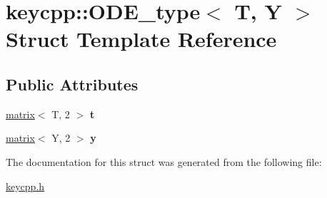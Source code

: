 \hypertarget{structkeycpp_1_1_o_d_e__type}{\section{keycpp\-:\-:O\-D\-E\-\_\-type$<$ T, Y $>$ Struct Template Reference}
\label{structkeycpp_1_1_o_d_e__type}
}
\subsection*{Public Attributes}
\begin{DoxyCompactItemize}
\item 
\hypertarget{structkeycpp_1_1_o_d_e__type_a7472927d5cc31aaf06d8dd1024b7640e}{\hyperlink{classkeycpp_1_1matrix}{matrix}$<$ T, 2 $>$ {\bfseries t}}\label{structkeycpp_1_1_o_d_e__type_a7472927d5cc31aaf06d8dd1024b7640e}

\item 
\hypertarget{structkeycpp_1_1_o_d_e__type_aafb0eeede0354cc546c0114ef3c15129}{\hyperlink{classkeycpp_1_1matrix}{matrix}$<$ Y, 2 $>$ {\bfseries y}}\label{structkeycpp_1_1_o_d_e__type_aafb0eeede0354cc546c0114ef3c15129}

\end{DoxyCompactItemize}


The documentation for this struct was generated from the following file\-:\begin{DoxyCompactItemize}
\item 
\hyperlink{keycpp_8h}{keycpp.\-h}\end{DoxyCompactItemize}
